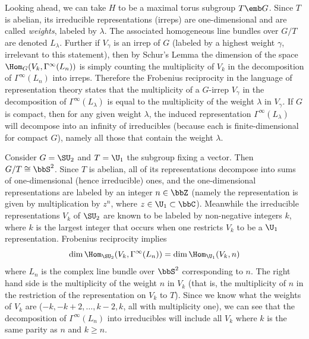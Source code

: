 \begin{example}
    Looking ahead, we can take $H$ to be a maximal torus subgroup $T\emb G$. Since $T$ is abelian, its irreducible representations (irreps) are one-dimensional and are called \emph{weights}, labeled by $\lambda$. The associated homogeneous line bundles over $G\slash T$ are denoted $L_\lambda$. Further if $V_\gamma$ is an irrep of $G$ (labeled by a highest weight $\gamma$, irrelevant to this statement), then by Schur's Lemma the dimension of the space $\Hom_G(V_k,\Gamma^\infty(L_n))$ is simply counting the multiplicity of $V_k$ in the decomposition of $\Gamma^\infty(L_n)$ into irreps. Therefore the Frobenius reciprocity in the language of representation theory states that the multiplicity of a $G$-irrep $V_\gamma$ in the decomposition of $\Gamma^\infty(L_\lambda)$ is equal to the multiplicity of the weight $\lambda$ in $V_\gamma$. If $G$ is compact, then for any given weight $\lambda$, the induced representation $\Gamma^\infty(L_\lambda)$ will decompose into an infinity of irreducibles (because each is finite-dimensional for compact $G$), namely all those that contain the weight $\lambda$.

    Consider $G=\SU_2$ and $T=\U_1$ the subgroup fixing a vector. Then $G\slash T\cong \bbS^2$. Since $T$ is abelian, all of its representations decompose into sums of one-dimensional (hence irreducible) ones, and the one-dimensional representations are labeled by an integer $n\in\bbZ$ (namely the representation is given by multiplication by $z^n$, where $z\in\U_1\subset \bbC$). Meanwhile the irreducible representations $V_k$ of $\SU_2$ are known to be labeled by non-negative integers $k$, where $k$ is the largest integer that occurs when one restricts $V_k$ to be a $\U_1$ representation. Frobenius reciprocity implies
    \[\dim\Hom_{\SU_2}(V_k,\Gamma^\infty(L_n))=\dim \Hom_{\U_1}(V_k,n)\]
    where $L_n$ is the complex line bundle over $\bbS^2$ corresponding to $n$. The right hand side is the multiplicity of the weight $n$ in $V_k$ (that is, the multiplicity of $n$ in the restriction of the representation on $V_k$ to $T$). Since we know what the weights of $V_k$ are ($-k,-k+2,\ldots,k-2,k$, all with multiplicity one), we can see that the decomposition of $\Gamma^\infty(L_n)$ into irreducibles will include all $V_k$ where $k$ is the same parity as $n$ and $k\geq n$.


\end{example}
